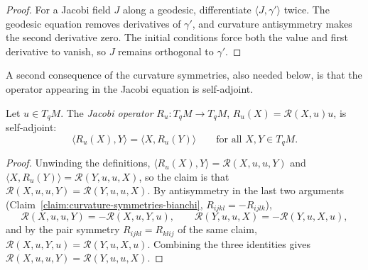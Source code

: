 \begin{proof}
\sketch
{}

For a Jacobi field $J$ along a geodesic, differentiate $\langle J,\gamma'\rangle$ twice. The geodesic equation removes derivatives of $\gamma'$, and curvature antisymmetry makes the second derivative zero. The initial conditions force both the value and first derivative to vanish, so $J$ remains orthogonal to $\gamma'$.
\end{proof}

A second consequence of the curvature symmetries, also needed below, is
that the operator appearing in the Jacobi equation is self-adjoint.

\begin{lemma}
\label{lem:jacobi-operator-symmetric}





Let $u\in T_qM$. The {\sl Jacobi operator} $R_u\colon T_qM\to T_qM$,
$R_u(X)={\mathcal R}(X,u)u$, is self-adjoint:
$$\langle R_u(X),Y\rangle=\langle X,R_u(Y)\rangle
\qquad\text{for all }X,Y\in T_qM.$$
\end{lemma}

\begin{proof}
\sketch
{}

Unwinding the definitions, $\langle R_u(X),Y\rangle={\mathcal
R}(X,u,u,Y)$ and $\langle X,R_u(Y)\rangle={\mathcal R}(Y,u,u,X)$, so
the claim is that ${\mathcal R}(X,u,u,Y)={\mathcal R}(Y,u,u,X)$. By
antisymmetry in the last two arguments
(Claim~\ref{claim:curvature-symmetries-bianchi},
$R_{ijkl}=-R_{ijlk}$),
$${\mathcal R}(X,u,u,Y)=-{\mathcal R}(X,u,Y,u),\qquad
{\mathcal R}(Y,u,u,X)=-{\mathcal R}(Y,u,X,u),$$
and by the pair symmetry $R_{ijkl}=R_{klij}$ of the same claim,
${\mathcal R}(X,u,Y,u)={\mathcal R}(Y,u,X,u)$. Combining the three
identities gives ${\mathcal R}(X,u,u,Y)={\mathcal R}(Y,u,u,X)$.
\end{proof}


